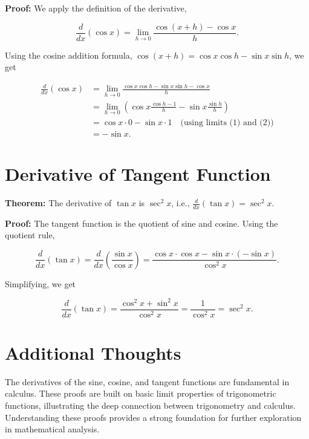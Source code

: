 \documentclass[a4paper,12pt]{book}
\begin{document}
\textbf{Proof:} We apply the definition of the derivative,

\begin{equation}
    \frac{d}{dx}(\cos x) = \lim_{h \to 0} \frac{\cos(x+h) - \cos x}{h}.
\end{equation}

Using the cosine addition formula, $\cos(x+h) = \cos x \cos h - \sin x \sin h$, we get

\begin{align*}
    \frac{d}{dx}(\cos x) &= \lim_{h \to 0} \frac{\cos x \cos h - \sin x \sin h - \cos x}{h} \\
                         &= \lim_{h \to 0} \left(\cos x \frac{\cos h - 1}{h} - \sin x \frac{\sin h}{h}\right) \\
                         &= \cos x \cdot 0 - \sin x \cdot 1 \quad \text{(using limits (1) and (2))} \\
                         &= -\sin x.
\end{align*}

\section*{Derivative of Tangent Function}

\textbf{Theorem:} The derivative of $\tan x$ is $\sec^2 x$, i.e., $\frac{d}{dx}(\tan x) = \sec^2 x$.

\textbf{Proof:} The tangent function is the quotient of sine and cosine. Using the quotient rule,

\begin{equation}
    \frac{d}{dx}(\tan x) = \frac{d}{dx}\left(\frac{\sin x}{\cos x}\right) = \frac{\cos x \cdot \cos x - \sin x \cdot (-\sin x)}{\cos^2 x}.
\end{equation}

Simplifying, we get

\begin{equation}
    \frac{d}{dx}(\tan x) = \frac{\cos^2 x + \sin^2 x}{\cos^2 x} = \frac{1}{\cos^2 x} = \sec^2 x.
\end{equation}

\section*{Additional Thoughts}

The derivatives of the sine, cosine, and tangent functions are fundamental in calculus. These proofs are built on basic limit properties of trigonometric functions, illustrating the deep connection between trigonometry and calculus. Understanding these proofs provides a strong foundation for further exploration in mathematical analysis.
\end{document}

